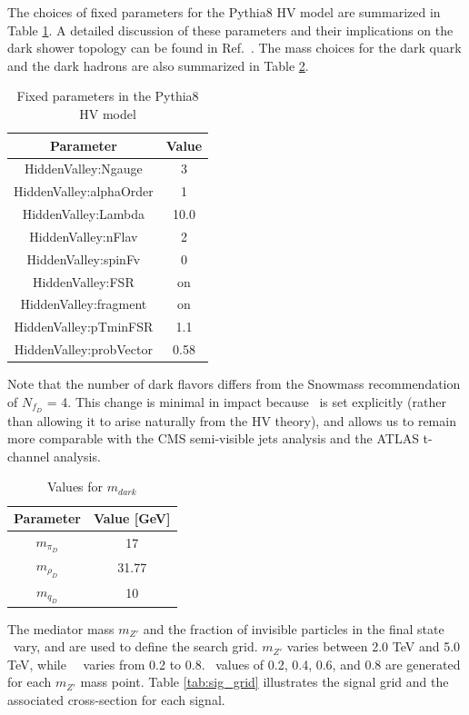 The choices of fixed parameters for the Pythia8 HV model are summarized in Table \ref{tab:model_fixed_params}.
A detailed discussion of these parameters and their implications on the dark shower topology can be found in Ref.~\cite{snowmass}. 
The mass choices for the dark quark and the dark hadrons are also summarized in Table \ref{tab:model_mdark}. 

\begin{table}
\centering
  \begin{tabular}{ |c|c| }
    \hline
    Parameter & Value \\
    \hline
     HiddenValley:Ngauge & 3 \\
     HiddenValley:alphaOrder & 1\\
     HiddenValley:Lambda & 10.0\\
     HiddenValley:nFlav & 2\\
     HiddenValley:spinFv & 0\\
     HiddenValley:FSR & on\\
     HiddenValley:fragment & on\\
     HiddenValley:pTminFSR & 1.1\\
     HiddenValley:probVector & 0.58\\
    \hline
  \end{tabular}
  \caption{Fixed parameters in the Pythia8 HV model}
  \label{tab:model_fixed_params}
\end{table}

Note that the number of dark flavors differs from the Snowmass recommendation of $N_{f_D}$ = 4. 
This change is minimal in impact because \rinv~is set explicitly (rather than allowing it to arise naturally from the HV theory), and allows us to remain more comparable with the CMS semi-visible jets analysis and the ATLAS t-channel analysis. \par

\begin{table}
\centering
  \begin{tabular}{ |c|c| }
    \hline
    Parameter & Value [GeV] \\
    \hline
     $m_{\pi_D}$ & 17 \\
     $m_{\rho_D}$ & 31.77 \\ 
     $m_{q_D}$ & 10 \\ 
    \hline
  \end{tabular}
  \caption{Values for $m_{dark}$}
  \label{tab:model_mdark}
\end{table}

The mediator mass $m_{Z'}$ and the fraction of invisible particles in the final state \rinv~vary, and are used to define the search grid. $m_{Z'}$ varies between 2.0 TeV and 5.0 TeV, while~\rinv~ varies from 0.2 to 0.8. \rinv~values of 0.2, 0.4, 0.6, and 0.8 are generated for each $m_{Z'}$ mass point. Table \ref{tab:sig_grid} illustrates the signal grid and the associated cross-section for each signal.

